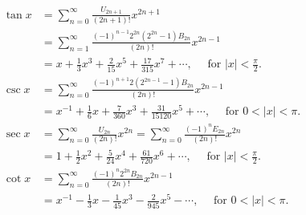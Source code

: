 

$$
\begin{aligned}
\tan x & =\sum_{n=0}^{\infty} \frac{U_{2 n+1}}{(2 n+1) !} x^{2 n+1} \\
& =\sum_{n=1}^{\infty} \frac{(-1)^{n-1} 2^{2 n}\left(2^{2 n}-1\right) B_{2 n}}{(2 n) !} x^{2 n-1} \\
& =x+\frac{1}{3} x^3+\frac{2}{15} x^5+\frac{17}{315} x^7+\cdots, \quad \text { for }|x|<\frac{\pi}{2} . \\
\csc x & =\sum_{n=0}^{\infty} \frac{(-1)^{n+1} 2\left(2^{2 n-1}-1\right) B_{2 n}}{(2 n) !} x^{2 n-1} \\
& =x^{-1}+\frac{1}{6} x+\frac{7}{360} x^3+\frac{31}{15120} x^5+\cdots, \quad \text { for } 0<|x|<\pi . \\
\sec x & =\sum_{n=0}^{\infty} \frac{U_{2 n}}{(2 n) !} x^{2 n}=\sum_{n=0}^{\infty} \frac{(-1)^n E_{2 n}}{(2 n) !} x^{2 n} \\
& =1+\frac{1}{2} x^2+\frac{5}{24} x^4+\frac{61}{720} x^6+\cdots, \quad \text { for }|x|<\frac{\pi}{2} . \\
\cot x & =\sum_{n=0}^{\infty} \frac{(-1)^n 2^{2 n} B_{2 n}}{(2 n) !} x^{2 n-1} \\
& =x^{-1}-\frac{1}{3} x-\frac{1}{45} x^3-\frac{2}{945} x^5-\cdots, \quad \text { for } 0<|x|<\pi .
\end{aligned}
$$